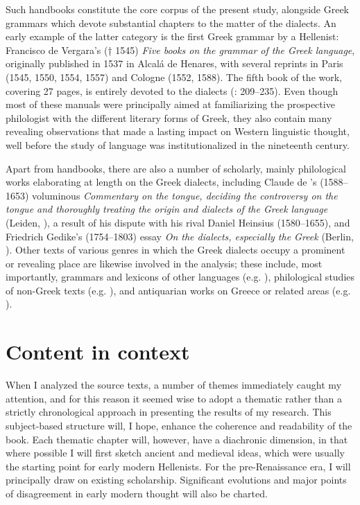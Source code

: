 Such handbooks constitute the core corpus of the present study, alongside Greek grammars which devote substantial chapters to the matter of the dialects. An early example of the latter category is the first Greek grammar by a  Hellenist: Francisco de Vergara’s († 1545) \textit{Five books on the grammar of the Greek language}, originally published in 1537 in Alcalá de Henares, with several reprints in Paris (1545, 1550, 1554, 1557) and Cologne (1552, 1588). The fifth book of the work, covering 27 pages, is entirely devoted to the dialects (\citealt{Vergara1537}: 209–235). Even though most of these manuals were principally aimed at familiarizing the prospective philologist with the different literary forms of Greek, they also contain many revealing observations that made a lasting impact on Western linguistic thought, well before the study of language was institutionalized in the nineteenth century.

Apart from handbooks, there are also a number of scholarly, mainly philological works elaborating at length on the Greek dialects, including Claude de \citeauthor{Saumaise1643a}’s (1588–1653) voluminous \textit{Commentary on the  tongue, deciding the controversy on the  tongue and thoroughly treating the origin and dialects of the Greek language} (Leiden, \citeyear{Saumaise1643a}), a result of his dispute with his rival Daniel Heinsius (1580–1655), and Friedrich Gedike’s (1754–1803)  essay \textit{On the dialects, especially the Greek} (Berlin, \citeyear{Gedike1782}). Other texts of various genres in which the Greek dialects occupy a prominent or revealing place are likewise involved in the analysis; these include, most importantly, grammars and lexicons of other languages (e.g. \citealt{Gill1619}), philological studies of non-Greek texts (e.g. \citealt{Schultens1748}), and antiquarian works on Greece or related areas (e.g. \citealt{Castelli1769}).

\section{Content in context}\label{sec:1.3}

When I analyzed the source texts, a number of themes immediately caught my attention, and for this reason it seemed wise to adopt a thematic rather than a strictly chronological approach in presenting the results of my research. This subject-based structure will, I hope, enhance the coherence and readability of the book. Each thematic chapter will, however, have a diachronic dimension, in that where possible I will first sketch ancient and medieval ideas, which were usually the starting point for early modern Hellenists. For the pre-Renaissance era, I will principally draw on existing scholarship. Significant evolutions and major points of disagreement in early modern thought will also be charted.

